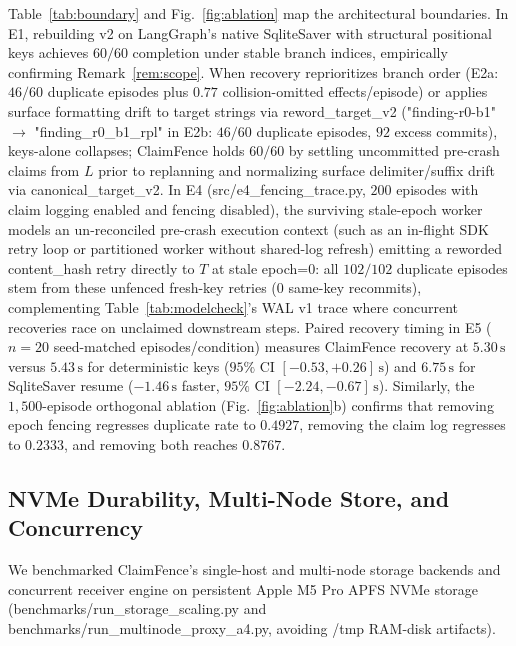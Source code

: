 \documentclass[10pt,journal]{IEEEtran}
\def\CF{ClaimFence}%
\def\texttt#1{#1}%
\theoremstyle{definition}
\theoremstyle{remark}
\newcommand{\CF}{\textsc{ClaimFence}}
\begin{document}
Table~\ref{tab:boundary} and Fig.~\ref{fig:ablation} map the architectural boundaries. In E1, rebuilding v2 on \texttt{LangGraph}'s native \texttt{SqliteSaver} with structural positional keys achieves $60/60$ completion under stable branch indices, empirically confirming Remark~\ref{rem:scope}. When recovery reprioritizes branch order (E2a: $46/60$ duplicate episodes plus $0.77$ collision-omitted effects/episode) or applies surface formatting drift to target strings via \texttt{reword\_target\_v2} (\texttt{"finding-r0-b1"} $\to$ \texttt{"finding\_r0\_b1\_rpl"} in E2b: $46/60$ duplicate episodes, $92$ excess commits), keys-alone collapses; \CF{} holds $60/60$ by settling uncommitted pre-crash claims from $L$ prior to replanning and normalizing surface delimiter/suffix drift via \texttt{canonical\_target\_v2}. In E4 (\texttt{src/e4\_fencing\_trace.py}, $200$ episodes with claim logging enabled and fencing disabled), the surviving stale-epoch worker models an un-reconciled pre-crash execution context (such as an in-flight SDK retry loop or partitioned worker without shared-log refresh) emitting a reworded \texttt{content\_hash} retry directly to $T$ at stale \texttt{epoch=0}: all $102/102$ duplicate episodes stem from these unfenced fresh-key retries (\texttt{0} same-key recommits), complementing Table~\ref{tab:modelcheck}'s \texttt{WAL v1} trace where concurrent recoveries race on unclaimed downstream steps. Paired recovery timing in E5 ($n=20$ seed-matched episodes/condition) measures \CF{} recovery at $5.30\,\mathrm{s}$ versus $5.43\,\mathrm{s}$ for deterministic keys ($95\%$ CI $[-0.53, +0.26]\,\mathrm{s}$) and $6.75\,\mathrm{s}$ for \texttt{SqliteSaver} resume ($-1.46\,\mathrm{s}$ faster, $95\%$ CI $[-2.24, -0.67]\,\mathrm{s}$). Similarly, the $1{,}500$-episode orthogonal ablation (Fig.~\ref{fig:ablation}b) confirms that removing epoch fencing regresses duplicate rate to $0.4927$, removing the claim log regresses to $0.2333$, and removing both reaches $0.8767$.

\subsection{NVMe Durability, Multi-Node Store, and Concurrency}\label{sec:eval_storage}
We benchmarked \CF{}'s single-host and multi-node storage backends and concurrent receiver engine on persistent Apple M5 Pro APFS NVMe storage (\texttt{benchmarks/\allowbreak run\_storage\_scaling.py} and \texttt{benchmarks/\allowbreak run\_multinode\_proxy\_a4.py}, avoiding \texttt{/tmp} RAM-disk artifacts).
\end{document}
